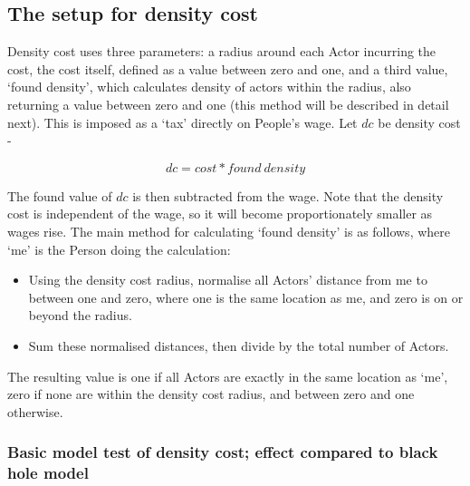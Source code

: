 
\subsection{The setup for density cost \label{sec:densitycostsetup}}

Density cost uses three parameters: a radius around each Actor incurring the cost, the cost itself, defined as a value between zero and one, and a third value, `found density', which calculates density of actors within the radius, also returning a value between zero and one (this method will be described in detail next). This is imposed as a `tax' directly on People's wage. Let $dc$ be density cost -

\begin{equation}
dc = cost * found\ density
\label{eq:densitycost}
\end{equation}

The found value of $dc$ is then subtracted from the wage. Note that the density cost is independent of the wage, so it will become proportionately smaller as wages rise. The main method for calculating `found density' is as follows, where `me' is the Person doing the calculation:

\begin{itemize}
	\item Using the density cost radius, normalise all Actors' distance from me to between one and zero, where one is the same location as me, and zero is on or beyond the radius.
	\item Sum these normalised distances, then divide by the total number of Actors.
\end{itemize}

The resulting value is one if all Actors are exactly in the same location as `me', zero if none are within the density cost radius, and between zero and one otherwise. 


\subsubsection{Basic model test of density cost; effect compared to black hole model}

